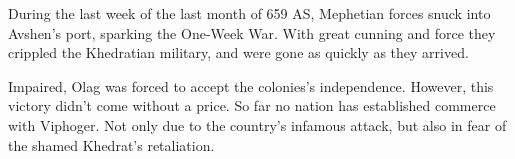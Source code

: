 During the last week of the last month of 659 AS, Mephetian forces snuck into Avshen's port, sparking the One-Week War.
With great cunning and force they crippled the Khedratian military, and were gone as quickly as they arrived.

Impaired, Olag was forced to accept the colonies's independence.
However, this victory didn't come without a price.
So far no nation has established commerce with Viphoger.
Not only due to the country's infamous attack, but also in fear of the shamed Khedrat's retaliation.

\newpage
